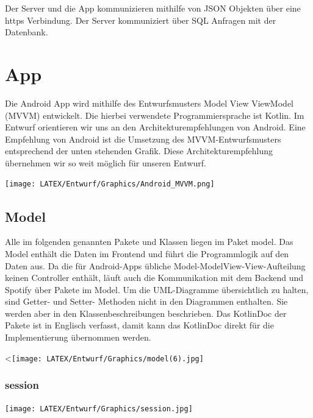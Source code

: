 \documentclass[oneside, ngerman]{sdqtechreport}
\begin{document}
Der Server und die App kommunizieren mithilfe von JSON Objekten über eine https Verbindung. Der Server kommuniziert über SQL Anfragen mit der Datenbank.

\chapter{App}
\label{chap:App}

Die Android App wird mithilfe des Entwurfsmusters Model View ViewModel (MVVM) entwickelt. Die hierbei verwendete Programmiersprache ist Kotlin.
Im Entwurf orientieren wir uns an den Architekturempfehlungen von Android. Eine Empfehlung von Android ist die Umsetzung des MVVM-Entwurfsmusters entsprechend der unten stehenden Grafik. Diese Architekturempfehlung übernehmen wir so weit möglich für unseren Entwurf.

\begin{center}
\texttt{[image: LATEX/Entwurf/Graphics/Android\_MVVM.png]}
\end{center}


\section{Model}
\label{sec:App:Model}
Alle im folgenden genannten Pakete und Klassen liegen im Paket model. Das Model enthält die Daten im Frontend und führt die Programmlogik auf den Daten aus. Da die für Android-Apps übliche Model-ModelView-View-Aufteilung keinen Controller enthält, läuft auch die Kommunikation mit dem  Backend und Spotify über Pakete im Model.
Um die UML-Diagramme übersichtlich zu halten, sind Getter- und Setter-  Methoden nicht in den Diagrammen enthalten. Sie werden aber in den Klassenbeschreibungen beschrieben.
Das KotlinDoc der Pakete ist in Englisch verfasst, damit kann das KotlinDoc direkt für die Implementierung übernommen werden.


<\texttt{[image: LATEX/Entwurf/Graphics/model(6).jpg]}
\subsection{session}
\label{sec:App:Model:SessionPacket}
\begin{center}
   \texttt{[image: LATEX/Entwurf/Graphics/session.jpg]} 
\end{center}
\end{document}
